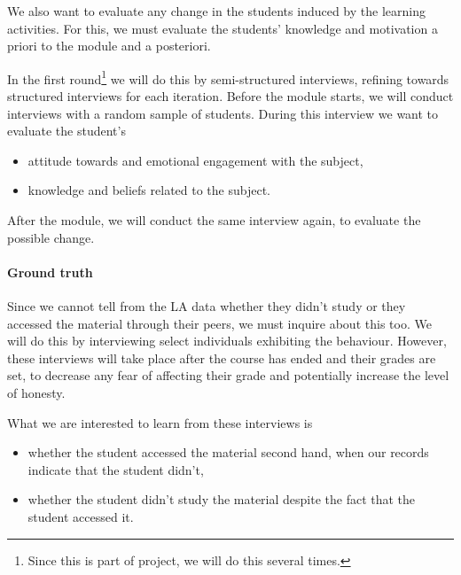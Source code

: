 We also want to evaluate any change in the students induced by the learning 
activities.
For this, we must evaluate the students' knowledge and motivation a priori to 
the module and a posteriori.

In the first round\footnote{%
  Since this is part of  project, we will do this several times.
} we will do this by semi-structured interviews, refining 
towards structured interviews for each iteration.
Before the module starts, we will conduct interviews with a random sample of 
students.
During this interview we want to evaluate the student's
\begin{itemize}
  \item attitude towards and emotional engagement with the subject,
  \item knowledge and beliefs related to the subject.
\end{itemize}

After the module, we will conduct the same interview again, to evaluate the 
possible change.

\paragraph{Ground truth}

Since we cannot tell from the \ac{LA} data whether they didn't study or they 
accessed the material through their peers, we must inquire about this too.
We will do this by interviewing select individuals exhibiting the behaviour.
However, these interviews will take place after the course has ended and their 
grades are set, to decrease any fear of affecting their grade and potentially 
increase the level of honesty.

What we are interested to learn from these interviews is
\begin{itemize}
  \item whether the student accessed the material second hand, when our records 
    indicate that the student didn't,
  \item whether the student didn't study the material despite the fact that the 
    student accessed it.
\end{itemize}
